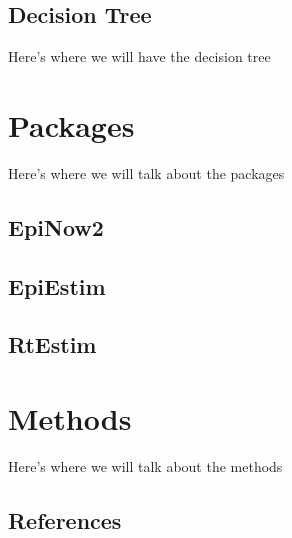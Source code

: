 \documentclass[
  letterpaper,
  DIV=11,
  numbers=noendperiod]{scrreprt}
\newlength{\cslhangindent}
\newenvironment{CSLReferences}[2] %
 {\begin{list}{}{%
  \setlength{\itemindent}{0pt}
  \setlength{\leftmargin}{0pt}
  \setlength{\parsep}{0pt}
  \ifodd #1
   \setlength{\leftmargin}{\cslhangindent}
   \setlength{\itemindent}{-1\cslhangindent}
  \fi
  \setlength{\itemsep}{#2\baselineskip}}}
 {\end{list}}
\begin{document}

\chapter{Decision Tree}\label{decision-tree}

Here's where we will have the decision tree

\part{Packages}

Here's where we will talk about the packages

\chapter*{EpiNow2}\label{epinow2}


\chapter*{EpiEstim}\label{epiestim}


\chapter*{RtEstim}\label{rtestim}


\part{Methods}

Here's where we will talk about the methods


\chapter*{References}\label{references}


\label{refs}
\begin{CSLReferences}{0}{1}
\end{CSLReferences}
\end{document}
